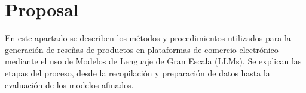 \section{Proposal}
En este apartado se describen los métodos y procedimientos utilizados para la generación de reseñas de productos en plataformas de comercio electrónico mediante el uso de Modelos de Lenguaje de Gran Escala (LLMs). Se explican las etapas del proceso, desde la recopilación y preparación de datos hasta la evaluación de los modelos afinados.